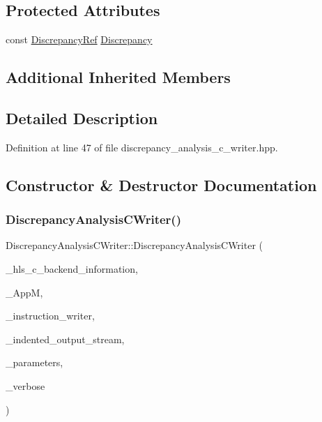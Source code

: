 \subsection*{Protected Attributes}
\begin{DoxyCompactItemize}
\item 
const \hyperlink{Discrepancy_8hpp_a9fb5a8938b4eeaafdaf7707f583f0193}{Discrepancy\+Ref} \hyperlink{classDiscrepancyAnalysisCWriter_ac90f9f7924ce6885161d69cac33672bd}{Discrepancy}
\end{DoxyCompactItemize}
\subsection*{Additional Inherited Members}


\subsection{Detailed Description}


Definition at line 47 of file discrepancy\+\_\+analysis\+\_\+c\+\_\+writer.\+hpp.



\subsection{Constructor \& Destructor Documentation}
\mbox{\label{classDiscrepancyAnalysisCWriter_a19aa97789a4f8c8b4c52a4408d9bb3cc}} 
\subsubsection{\texorpdfstring{Discrepancy\+Analysis\+C\+Writer()}{DiscrepancyAnalysisCWriter()}}
{\footnotesize\ttfamily Discrepancy\+Analysis\+C\+Writer\+::\+Discrepancy\+Analysis\+C\+Writer (\begin{DoxyParamCaption}\item[{const H\+L\+S\+C\+Backend\+Information\+Const\+Ref}]{\+\_\+hls\+\_\+c\+\_\+backend\+\_\+information,  }\item[{const \hyperlink{application__manager_8hpp_abb985163a2a3fb747f6f03b1eaadbb44}{application\+\_\+manager\+Const\+Ref}}]{\+\_\+\+AppM,  }\item[{const \hyperlink{instruction__writer_8hpp_a40ea26c38a2909ba48f88f997144b260}{Instruction\+Writer\+Ref}}]{\+\_\+instruction\+\_\+writer,  }\item[{const \hyperlink{indented__output__stream_8hpp_ab32278e11151ef292759c88e99b77feb}{Indented\+Output\+Stream\+Ref}}]{\+\_\+indented\+\_\+output\+\_\+stream,  }\item[{const \hyperlink{Parameter_8hpp_a37841774a6fcb479b597fdf8955eb4ea}{Parameter\+Const\+Ref}}]{\+\_\+parameters,  }\item[{bool}]{\+\_\+verbose }\end{DoxyParamCaption})}



